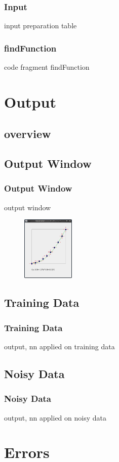 \documentclass{beamer}
\begin{document}
\begin{frame}
\frametitle{Input}
input preparation table
\end{frame}

\begin{frame}
\frametitle{findFunction}
code fragment findFunction
\end{frame}

\section{Output}
\subsection{overview}
\begin{frame}
    \tableofcontents
\end{frame}
\subsection{Output Window}
\begin{frame}
\frametitle{Output Window}
output window
	\begin{figure}
		\centering
		\includegraphics[width=2.5cm]{fig/vis.png}
	\end{figure}
\end{frame}

\subsection{Training Data}
\begin{frame}
\frametitle{Training Data}
output, nn applied on training data
\end{frame}

\subsection{Noisy Data}
\begin{frame}
\frametitle{Noisy Data}
output, nn applied on noisy data
\end{frame}

\section{Errors}
\end{document}
